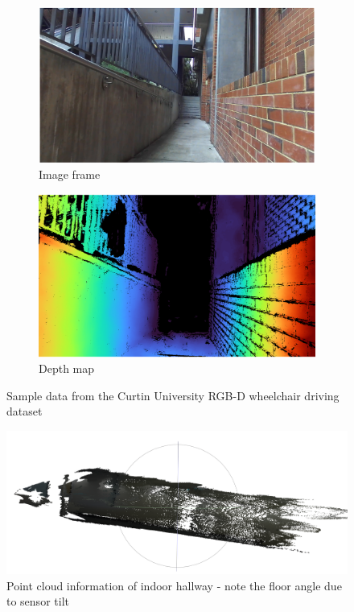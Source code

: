 \begin{figure}[H]
    \centering
    \begin{subfigure}{.48\textwidth}
        \centering
        \includegraphics[width=\linewidth]{images/zed_sample_image.png}
        \caption{Image frame}
    \end{subfigure}
    \quad
    \begin{subfigure}{.47\textwidth}
        \centering
        \includegraphics[width=\linewidth]{images/zed_sample_depth.png}
        \caption{Depth map}
    \end{subfigure}
    \caption{Sample data from the Curtin University RGB-D wheelchair driving dataset}
    \label{fig:zed_sample_dataset}
\end{figure}

\begin{figure}[H]
    \centering
    \includegraphics[width=0.7\linewidth]{images/meshlab_point_cloud.png}
    \caption{Point cloud information of indoor hallway - note the floor angle due to sensor tilt}
    \label{fig:meshlab_point_cloud}
\end{figure}

